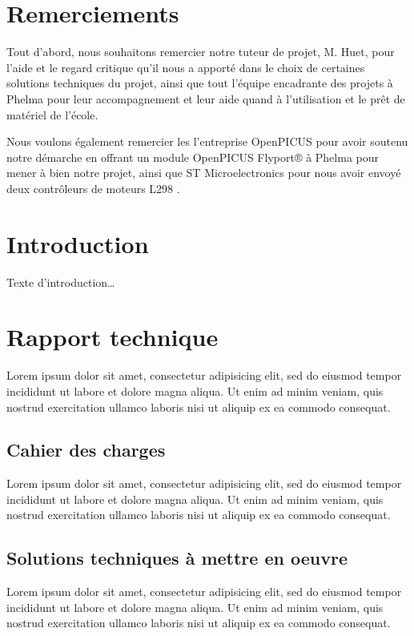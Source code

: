 \documentclass[a4paper,12pt]{report}
\begin{document}
\chapter*{Remerciements}
Tout d’abord, nous souhaitons remercier notre tuteur de projet, M. Huet, pour l’aide et le regard critique qu’il nous a apporté dans le choix de certaines solutions techniques du projet, ainsi que tout l’équipe encadrante des projets à Phelma pour leur accompagnement et leur aide quand à l’utilisation et le prêt de matériel de l’école.

Nous voulons également remercier les l’entreprise OpenPICUS pour avoir soutenu notre démarche en offrant un module OpenPICUS Flyport® à Phelma pour mener à bien notre projet, ainsi que ST Microelectronics pour nous avoir envoyé deux contrôleurs de moteurs L298 .

\chapter*{Introduction}
Texte d'introduction…

\tableofcontents

\chapter{Rapport technique}
Lorem ipsum dolor sit amet, consectetur adipisicing elit, sed do eiusmod tempor incididunt ut labore et dolore magna aliqua. Ut enim ad minim veniam, quis nostrud exercitation ullamco laboris nisi ut aliquip ex ea commodo consequat.


	\section{Cahier des charges}
	Lorem ipsum dolor sit amet, consectetur adipisicing elit, sed do eiusmod tempor incididunt ut labore et dolore magna aliqua. Ut enim ad minim veniam, quis nostrud exercitation ullamco laboris nisi ut aliquip ex ea commodo consequat.


	\section{Solutions techniques à mettre en oeuvre}
	Lorem ipsum dolor sit amet, consectetur adipisicing elit, sed do eiusmod tempor incididunt ut labore et dolore magna aliqua. Ut enim ad minim veniam, quis nostrud exercitation ullamco laboris nisi ut aliquip ex ea commodo consequat.
	
\end{document}

